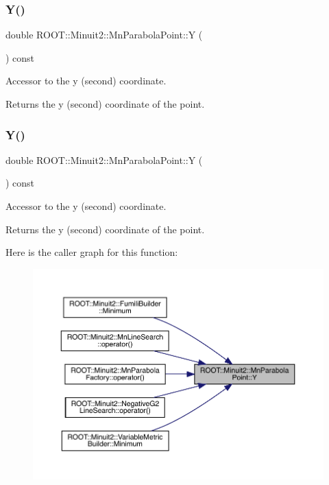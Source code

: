 \subsubsection{\texorpdfstring{Y()}{Y()}\hspace{0.1cm}{\footnotesize\ttfamily [1/2]}}
{\footnotesize\ttfamily double R\+O\+O\+T\+::\+Minuit2\+::\+Mn\+Parabola\+Point\+::Y (\begin{DoxyParamCaption}{ }\end{DoxyParamCaption}) const\hspace{0.3cm}{\ttfamily [inline]}}

Accessor to the y (second) coordinate.

\begin{DoxyReturn}{Returns}
the y (second) coordinate of the point. 
\end{DoxyReturn}
\mbox{\label{classROOT_1_1Minuit2_1_1MnParabolaPoint_abc0c0fa35bdee10c52229aadef4e20be}} 
\subsubsection{\texorpdfstring{Y()}{Y()}\hspace{0.1cm}{\footnotesize\ttfamily [2/2]}}
{\footnotesize\ttfamily double R\+O\+O\+T\+::\+Minuit2\+::\+Mn\+Parabola\+Point\+::Y (\begin{DoxyParamCaption}{ }\end{DoxyParamCaption}) const\hspace{0.3cm}{\ttfamily [inline]}}

Accessor to the y (second) coordinate.

\begin{DoxyReturn}{Returns}
the y (second) coordinate of the point. 
\end{DoxyReturn}
Here is the caller graph for this function\+:\nopagebreak
\begin{figure}[H]
\begin{center}
\leavevmode
\includegraphics[width=350pt]{de/de5/classROOT_1_1Minuit2_1_1MnParabolaPoint_abc0c0fa35bdee10c52229aadef4e20be_icgraph}
\end{center}
\end{figure}


